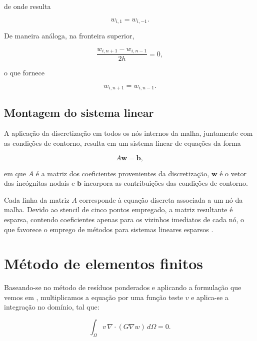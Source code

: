 \documentclass[brazil]{TCAM} %
\begin{document}
de onde resulta

\begin{equation*}
w_{i,1}=w_{i,-1}.
\end{equation*}

De maneira análoga, na fronteira superior,

\begin{equation*}
\frac{w_{i,n+1}-w_{i,n-1}}{2h}=0,
\end{equation*}

o que fornece

\begin{equation*}
w_{i,n+1}=w_{i,n-1}.
\end{equation*}

\subsection{Montagem do sistema linear}

A aplicação da discretização em todos os nós internos da malha,
juntamente com as condições de contorno, resulta em um sistema linear
de equações da forma

\begin{equation*}
A\mathbf{w}=\mathbf{b},
\end{equation*}

em que $A$ é a matriz dos coeficientes provenientes da discretização,
$\mathbf{w}$ é o vetor das incógnitas nodais e $\mathbf{b}$ incorpora
as contribuições das condições de contorno.

Cada linha da matriz $A$ corresponde à equação discreta associada a um
nó da malha. Devido ao stencil de cinco pontos empregado, a matriz
resultante é esparsa, contendo coeficientes apenas para os vizinhos
imediatos de cada nó, o que favorece o emprego de métodos para sistemas
lineares esparsos \cite{saad2003iterative}.

\section{Método de elementos finitos}

Baseando-se no método de resíduos ponderados e aplicando a formulação que vemos em \cite{logan,hughes2000finite}, multiplicamos a equação por uma função teste $v$ e aplica-se a integração no domínio, tal que:

\begin{equation*}
\int_{\Omega} v \, \nabla \cdot (G \nabla w)\, d\Omega = 0.
\end{equation*}
\end{document}
